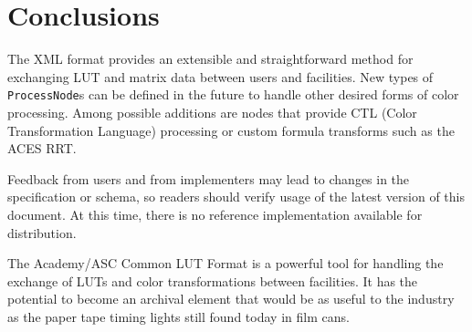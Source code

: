 \regularsectionformat
\chapter{Conclusions}
\label{sec:conclusions}

The XML format provides an extensible and straightforward method for exchanging LUT and matrix data between users and facilities. New types of \texttt{ProcessNode}s can be defined in the future to handle other desired forms of color processing. Among possible additions are nodes that provide  CTL (Color Transformation Language) processing or custom formula transforms such as the ACES RRT.

Feedback from users and from implementers may lead to changes in the specification or schema, so readers should verify usage of the latest version of this document. At this time, there is no reference implementation available for distribution.

The Academy/ASC Common LUT Format is a powerful tool for handling the exchange of LUTs and color transformations between facilities.  It has the potential to become an archival element that would be as useful to the industry as the paper tape timing lights still found today in film cans.